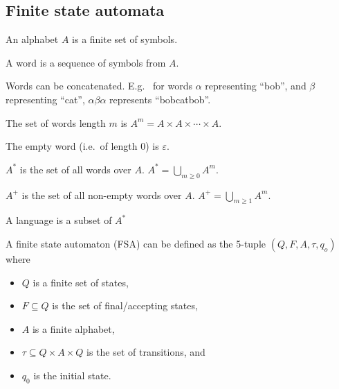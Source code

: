 \documentclass{article}
\begin{document}
\subsection{Finite state automata}
\begin{definition}[Alphabet]
    An alphabet \(A\) is a finite set of symbols.
\end{definition}
\begin{definition}[Word]
    A word is a sequence of symbols from \(A\).
\end{definition}
\begin{theorem}
    Words can be concatenated.
    E.g. \ for words \(\alpha\) representing ``bob'',
    and \(\beta\) representing ``cat'',
    \(\alpha\beta\alpha\) represents ``bobcatbob''.
\end{theorem}
\begin{theorem}
    The set of words length \(m\) is \(A^m = A\times A\times \cdots \times A\).
\end{theorem}
\begin{theorem}
    The empty word (i.e.\ of length 0) is \(\varepsilon\).
\end{theorem}
\begin{theorem}
    \(A^*\) is the set of all words over \(A\). \(A^* = \bigcup_{m\ge 0} A^m\).
\end{theorem}
\begin{theorem}
    \(A^+\) is the set of all non-empty words over \(A\). \(A^+ = \bigcup_{m\ge 1} A^m\).
\end{theorem}
\begin{definition}[Language]
    A language is a subset of \(A^*\)
\end{definition}
\begin{definition}
    A finite state automaton (FSA)
    can be defined as the 5-tuple
    \(\left(Q, F, A, \tau, q_o\right)\) where
    \begin{itemize}
        \item    \(Q\) is a finite set of states,
        \item    \(F\subseteq Q\) is the set of final/accepting states,
        \item    \(A\) is a finite alphabet,
        \item    \(\tau\subseteq Q\times A\times Q\) is the set of transitions, and
        \item    \(q_0\) is the initial state.
    \end{itemize}
\end{definition}
\end{document}

